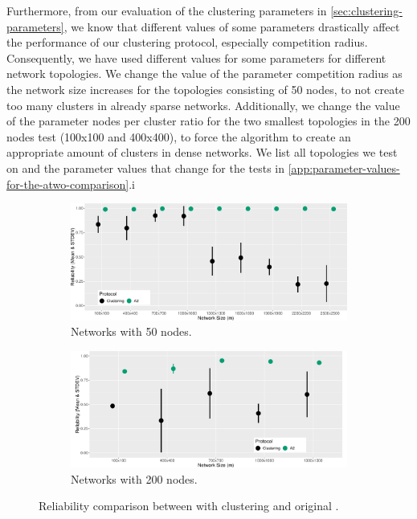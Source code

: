 Furthermore, from our evaluation of the clustering parameters in \cref{sec:clustering-parameters}, we know that different values of some parameters drastically affect the performance of our clustering protocol, especially competition radius. Consequently, we have used different values for some parameters for different network topologies. We change the value of the parameter competition radius as the network size increases for the topologies consisting of 50 nodes, to not create too many clusters in already sparse networks. Additionally, we change the value of the parameter nodes per cluster ratio for the two smallest topologies in the 200 nodes test (100x100 and 400x400), to force the algorithm to create an appropriate amount of clusters in dense networks. We list all topologies we test on and the parameter values that change for the tests in \cref{app:parameter-values-for-the-atwo-comparison}.i


\begin{figure}[bt]
    \centering
    \begin{subfigure}{0.7\textwidth}
        \centering
        \includegraphics[width=\textwidth]{figure/Results/ChaosComparison/ChaosComparison_50_Reliability.pdf}
        \caption{Networks with 50 nodes.}
        \label{subfig:reliability-50-nodes}
    \end{subfigure}
    \hfill
    \begin{subfigure}{0.7\textwidth}
        \centering
        \includegraphics[width=\textwidth]{figure/Results/ChaosComparison/ChaosComparison_200_Reliability.pdf}
        \caption{Networks with 200 nodes.}
        \label{subfig:reliabilty-200-nodes}
    \end{subfigure}
    \caption{Reliability comparison between \atwo{} with clustering and original \atwo{}.}
    \label{fig:reliability-result}
\end{figure}
